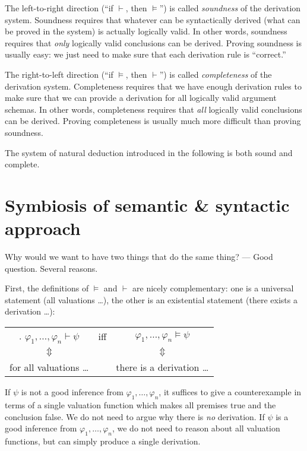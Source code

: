 \documentclass[nobib,nofonts]{tufte-handout}
\begin{document}
The left-to-right direction (``if $\vdash$, then $\models$'') is called \emph{soundness} of the derivation system.
Soundness requires that whatever can be syntactically derived (what can be proved in the system) is actually logically valid.
In other words, soundness requires that \emph{only} logically valid conclusions can be derived.
Proving soundness is usually easy: we just need to make sure that each derivation rule is ``correct.''

The right-to-left direction (``if $\models$, then $\vdash$'') is called \emph{completeness} of the derivation system.
Completeness requires that we have enough derivation rules to make sure that we can provide a derivation for all logically valid argument schemas.
In other words, completeness requires that \emph{all} logically valid conclusions can be derived.
Proving completeness is usually much more difficult than proving soundness.

The system of natural deduction introduced in the following is both sound and complete.

\section{Symbiosis of semantic \& syntactic approach}

Why would we want to have two things that do the same thing? ---
Good question.
Several reasons.

First, the definitions of $\models$ and $\vdash$ are nicely complementary: one is a universal statement (all valuations \dots), the other is an existential statement (there exists a derivation \dots):

\begin{center}
  \begin{tabular}{ccc}.
    $\varphi_{1}, \dots, \varphi_{n} \vdash \psi$ &
    iff &
    $\varphi_{1}, \dots, \varphi_{n} \models \psi$ \\
    $\Updownarrow$ & & $\Updownarrow$ \\
    for all valuations \dots && there is a derivation \dots
  \end{tabular}
\end{center}

\noindent If $\psi$ is not a good inference from $\varphi_{1}, \dots, \varphi_{n}$, it suffices to give a counterexample in terms of a single valuation function which makes all premises true and the conclusion false.
We do not need to argue why there is \emph{no} derivation.
If $\psi$ is a good inference from $\varphi_{1}, \dots, \varphi_{n}$, we do not need to reason about all valuation functions, but can simply produce a single derivation.
\end{document}
